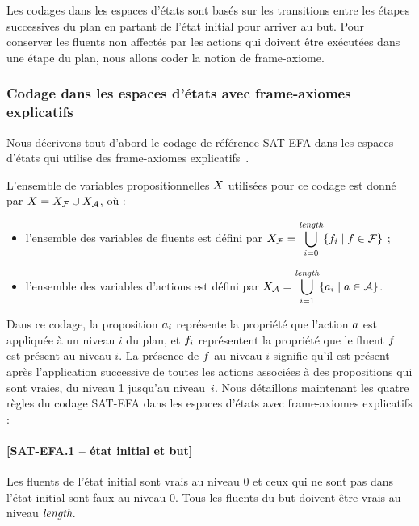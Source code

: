 %
%


Les codages dans les espaces d'états sont basés sur les transitions entre les étapes successives du plan en partant de l'état initial pour arriver au but.
Pour conserver les fluents non affectés par les actions qui doivent être exécutées dans une étape du plan, nous allons coder la notion de frame-axiome.

\subsubsection{Codage dans les espaces d'états avec frame-axiomes explicatifs}\label{chap:codages:satqbf:satefa}

Nous décrivons tout d'abord le codage de référence SAT-EFA dans les espaces d'états qui utilise des frame-axiomes explicatifs~\cite{MK99}.


L'ensemble de variables propositionnelles $X$ utilisées pour ce codage est donné par $X = X_{\mathcal{F}} \cup X_{\mathcal{A}}$, où :
\begin{itemize}
    \item l'ensemble des variables de fluents est défini par $\displaystyle X_{\mathcal{F}}=\bigcup_{i=0}^{\textit{length}}\{f_{i}\mid f\in\mathcal{F}\}$ ;
    \item l'ensemble des variables d'actions est défini par $\displaystyle X_{\mathcal{A}}=\bigcup_{i=1}^{\textit{length}}\{a_{i}\mid a\in\mathcal{A}\}$.
\end{itemize}

Dans ce codage, la proposition $a_{i}$ représente la propriété que l'action $a$ est appliquée à un niveau $i$ du plan, et $f_{i}$ représentent la propriété que le fluent $f$ est présent au niveau
$i$. La présence de $f$ au niveau $i$ signifie qu'il est présent après l'application successive de toutes les actions associées à des propositions qui sont vraies, du niveau 1 jusqu'au niveau~$i$. Nous détaillons maintenant les quatre règles du codage SAT-EFA dans les espaces d'états avec frame-axiomes explicatifs :





\paragraph*{[SAT-EFA.1 -- état initial et but]}
Les fluents de l'état initial sont vrais au niveau $0$ et ceux qui ne sont pas dans l'état initial sont faux au niveau $0$. Tous les fluents du but doivent être vrais au niveau $\textit{length}$.

